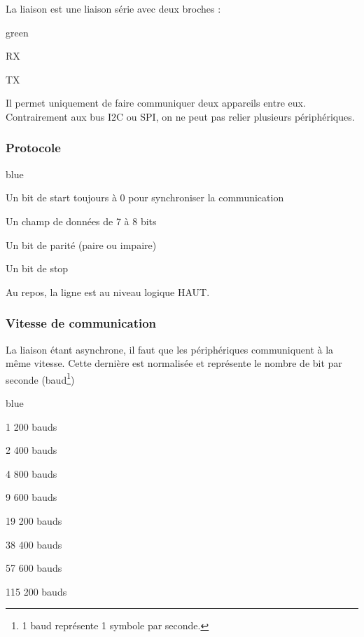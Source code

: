 La liaison  est une liaison série avec deux broches :

\begin{items}{green}{\Triangle}
    \item RX
    \item TX
\end{items}

Il permet uniquement de faire communiquer deux appareils entre eux.\\ 
Contrairement aux bus I2C ou SPI, on ne peut pas relier plusieurs périphériques.


\subsubsection{Protocole}

\begin{items}{blue}{\Triangle}
    \item Un bit de start toujours à 0 pour synchroniser la communication
    \item Un champ de données de 7 à 8 bits
    \item Un bit de parité (paire ou impaire)
    \item Un bit de stop
\end{items}


Au repos, la ligne est au niveau logique HAUT.

\subsubsection{Vitesse de communication}

La liaison étant asynchrone, il faut que les périphériques communiquent à la même vitesse. Cette dernière est normalisée et représente le nombre de bit par seconde (baud\footnote{1 baud représente 1 symbole par seconde.})

\begin{items}{blue}{\Triangle}
\item 1 200 bauds
\item 2 400 bauds
\item 4 800 bauds
\item 9 600 bauds
\item 19 200 bauds
\item 38 400 bauds
\item 57 600 bauds
\item 115 200 bauds
\end{items}

